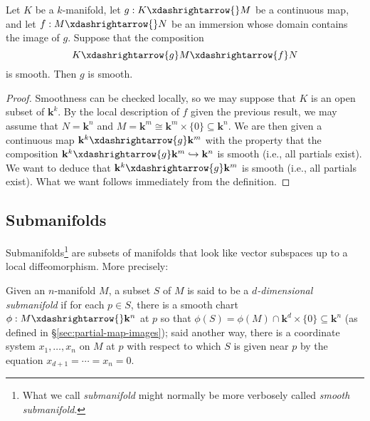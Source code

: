 \documentclass[reqno]{amsart} 
\begin{document}
\begin{corollary}\label{cor:checking-smoothness-via-immersions}
  Let $K$ be a $k$-manifold,
  let $g : K \xdashrightarrow{} M$ be a continuous map,
  and let $f : M  \xdashrightarrow{} N$ be an
  immersion whose domain contains the image of $g$.
  Suppose that the composition
  \begin{equation*}
  K \xdashrightarrow{g} M \xdashrightarrow{f} N
  \end{equation*}
  is smooth.
  Then $g$ is smooth.
\end{corollary}
\begin{proof}
  Smoothness can be checked locally, so we may suppose that $K$
  is an open subset of $\mathbf{k}^k$.  By the local description
  of $f$ given the previous result, we may assume that
  $N = \mathbf{k}^n$ and
  $M = \mathbf{k}^m \cong \mathbf{k}^m  \times \{0\}  \subseteq \mathbf{k}^n$.
  We are then given
  a continuous map $\mathbf{k}^k \xdashrightarrow{g} \mathbf{k}^m$
  with the property that the
  composition
  $\mathbf{k}^k \xdashrightarrow{g} \mathbf{k}^m \hookrightarrow
  \mathbf{k}^n$
  is smooth (i.e., all partials exist).
  We want to deduce that
  $\mathbf{k}^k \xdashrightarrow{g} \mathbf{k}^m$ is smooth
  (i.e., all partials exist).
  What we want follows
  immediately from the definition.
\end{proof}

\subsection{Submanifolds\label{sec:submflds}}
\label{sec:orgde0d03e}
Submanifolds\footnote{
 What we call \emph{submanifold}
 might normally be more verbosely called  \emph{smooth submanifold}.
}
are subsets of manifolds that look like vector subspaces up to a local diffeomorphism.
More precisely:
\begin{definition}
  Given an $n$-manifold $M$,
  a subset $S$ of $M$ is said
  to be a \emph{$d$-dimensional submanifold}
  if for each $p \in S$,
  there is a smooth chart
  $\phi : M \xdashrightarrow{} \mathbf{k}^n$
  at $p$
  so that $\phi(S) = \phi(M) \cap \mathbf{k}^d \times \{0\} \subseteq \mathbf{k}^n$
  (as defined in \S\ref{sec:partial-map-images});
  said another way,
  there is a coordinate system $x_1,\dotsc,x_n$ on $M$ at $p$
  with respect to which $S$ is given near $p$ by the equation
  $x_{d+1} = \dotsb  = x_n = 0$.
\end{definition}
\end{document}
